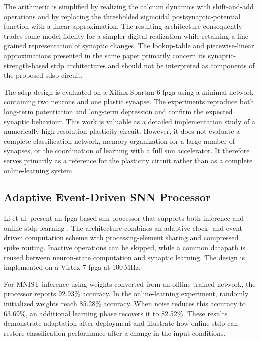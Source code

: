 The arithmetic is simplified by realizing the calcium dynamics with shift-and-add operations and by replacing the thresholded sigmoidal postsynaptic-potential function with a linear approximation. The resulting architecture consequently trades some model fidelity for a simpler digital realization while retaining a fine-grained representation of synaptic changes. The lookup-table and piecewise-linear approximations presented in the same paper primarily concern its synaptic-strength-based \gls{stdp} architectures and should not be interpreted as components of the proposed \gls{sdsp} circuit.

The \gls{sdsp} design is evaluated on a Xilinx Spartan-6 \gls{fpga} using a minimal network containing two neurons and one plastic synapse. The experiments reproduce both long-term potentiation and long-term depression and confirm the expected synaptic behaviour. This work is valuable as a detailed implementation study of a numerically high-resolution plasticity circuit. However, it does not evaluate a complete classification network, memory organization for a large number of synapses, or the coordination of learning with a full \gls{snn} accelerator. It therefore serves primarily as a reference for the plasticity circuit rather than as a complete online-learning system.

\subsection{Adaptive Event-Driven SNN Processor}

Li et al. present an \gls{fpga}-based \gls{snn} processor that supports both inference and online \gls{stdp} learning \cite{Li2021SNN}. The architecture combines an adaptive clock- and event-driven computation scheme with processing-element sharing and compressed spike routing. Inactive operations can be skipped, while a common datapath is reused between neuron-state computation and synaptic learning. The design is implemented on a Virtex-7 \gls{fpga} at 100\,MHz.

For MNIST inference using weights converted from an offline-trained network, the processor reports 92.93\% accuracy. In the online-learning experiment, randomly initialized weights reach 85.28\% accuracy. When noise reduces this accuracy to 63.69\%, an additional learning phase recovers it to 82.52\%. These results demonstrate adaptation after deployment and illustrate how online \gls{stdp} can restore classification performance after a change in the input conditions.


